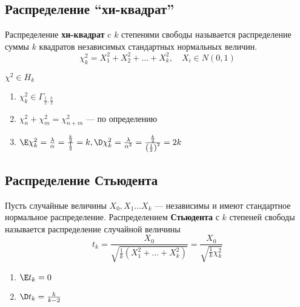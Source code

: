 \subsection{Распределение ``хи-квадрат''}

\begin{definition}
    Распределение \textbf{хи-квадрат} c \(k\) степенями свободы называется распределение суммы \(k\) квадратов независимых стандартных нормальных величин.
    \[\chi^2_k = X_1^2 + X_2^2 + \dots + X_k^2, \quad X_i \in N(0, 1)\]
\end{definition}
\begin{obozn}
    \(\chi^2 \in H_k\)
\end{obozn}

\begin{prop}\itemfix
    \begin{enumerate}
        \item \(\chi_k^2 \in \Gamma_{\frac{1}{2}, \frac{k}{2}}\)
        \item \(\chi_n^2 + \chi_m^2 = \chi_{n + m}^2\) --- по определению
        \item \(\E \chi_k^2 = \frac{\lambda}{\alpha} = \frac{\frac{k}{2}}{\frac{1}{2}} = k, \D \chi_k^2 = \frac{\lambda}{\alpha^2} = \frac{\frac{k}{2}}{\left(\frac{1}{2}\right)^2} = 2k\)
    \end{enumerate}
\end{prop}

\subsection{Распределение Стьюдента}

\begin{definition}
    Пусть случайные величины \(X_0, X_1 \dots X_k\) --- независимы и имеют стандартное нормальное распределение. Распределением \textbf{Стьюдента} с \(k\) степеней свободы называется распределение случайной величины
    \[t_k = \frac{X_0}{\sqrt{\frac{1}{k}(X_1^2 + \dots + X_k^2)}} = \frac{X_0}{\sqrt{\frac{1}{k} \chi_k^2}}\]
\end{definition}

\begin{prop}\itemfix
    \begin{enumerate}
        \item \(\E t_k = 0\)
        \item \(\D t_k = \frac{k}{k - 2}\)
    \end{enumerate}
\end{prop}

